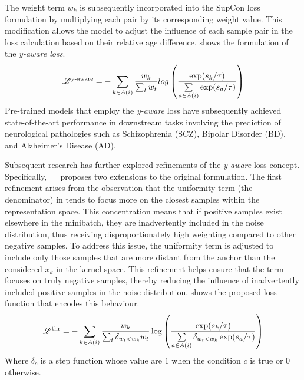 The weight term $w_k$ is subsequently incorporated into the SupCon loss
formulation by multiplying each pair by its corresponding weight
value. This modification allows the model to adjust the influence of each sample
pair in the loss calculation based on their relative age difference.
 shows the formulation of the \emph{y-aware loss}.
\begin{equation}
    \labeq{4_4}
    \mathscr{L}^{\text{y-aware}} = 
    -\sum_{k \in A(i)} \frac{w_k}{\sum_t w_t} log
    \left(
    \frac
    {\exp(s_k / \tau)}
    {\sum\limits_{a \in A(i)} \exp(s_a / \tau)}
    \right)
\end{equation}
Pre-trained models that employ the \emph{y-aware} loss have subsequently
achieved state-of-the-art performance in downstream tasks involving the
prediction of neurological pathologies such as Schizophrenia (SCZ), Bipolar
Disorder (BD), and Alzheimer's Disease (AD).

Subsequent research has further explored refinements of the \emph{y-aware} loss
concept. Specifically,
~\citeauthor{barbano_contrastive_2023}~
proposes two extensions to the original formulation. The first refinement arises
from the observation that the uniformity term (the denominator) in 
tends to focus more on the closest samples within the representation space. This
concentration means that if positive samples exist elsewhere in the minibatch,
they are inadvertently included in the noise distribution, thus receiving
disproportionately high weighting compared to other negative samples. To address
this issue, the uniformity term is adjusted to include only those samples that
are more distant from the anchor than the considered $x_k$ in the kernel
space. This refinement helps ensure that the term focuses on truly negative
samples, thereby reducing the influence of inadvertently included positive
samples in the noise distribution.  shows the proposed loss
function that encodes this behaviour.
\begin{equation}
    \labeq{4_5}
    \mathscr{L}^{\text{thr}} = 
    -\sum_{k \in A(i)} \frac{w_k}{\sum_t \delta_{w_t < w_k} w_t} \log
    \left(
    \frac
    {\exp(s_k / \tau)}
    {\sum\limits_{a \in A(i)} \delta_{w_t < w_k} \exp(s_a / \tau)}
    \right)
\end{equation}
Where $\delta_{c}$ is a step function whose value are $1$ when the condition
$c$ is true or $0$ otherwise.

